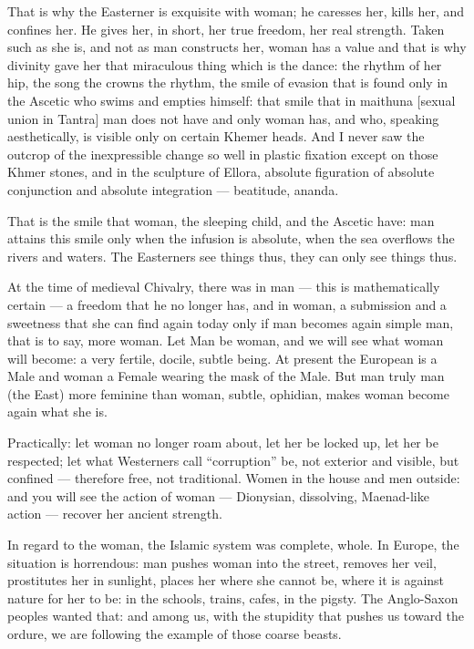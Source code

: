 That is why the Easterner is exquisite with woman; he caresses her, kills her, and confines her. He gives her, in short, her true freedom, her real strength. Taken such as she is, and not as man constructs her, woman has a value and that is why divinity gave her that miraculous thing which is the dance: the rhythm of her hip, the song the crowns the rhythm, the smile of evasion that is found only in the Ascetic who swims and empties himself: that smile that in maithuna [sexual union in Tantra] man does not have and only woman has, and who, speaking aesthetically, is visible only on certain Khemer heads. And I never saw the outcrop of the inexpressible change so well in plastic fixation except on those Khmer stones, and in the sculpture of Ellora, absolute figuration of absolute conjunction and absolute integration — beatitude, ananda.

That is the smile that woman, the sleeping child, and the Ascetic have: man attains this smile only when the infusion is absolute, when the sea overflows the rivers and waters. The Easterners see things thus, they can only see things thus.

At the time of medieval Chivalry, there was in man — this is mathematically certain — a freedom that he no longer has, and in woman, a submission and a sweetness that she can find again today only if man becomes again simple man, that is to say, more woman. Let Man be woman, and we will see what woman will become: a very fertile, docile, subtle being. At present the European is a Male and woman a Female wearing the mask of the Male. But man truly man (the East) more feminine than woman, subtle, ophidian, makes woman become again what she is.

Practically: let woman no longer roam about, let her be locked up, let her be respected; let what Westerners call “corruption” be, not exterior and visible, but confined — therefore free, not traditional. Women in the house and men outside: and you will see the action of woman — Dionysian, dissolving, Maenad-like action — recover her ancient strength.

In regard to the woman, the Islamic system was complete, whole. In Europe, the situation is horrendous: man pushes woman into the street, removes her veil, prostitutes her in sunlight, places her where she cannot be, where it is against nature for her to be: in the schools, trains, cafes, in the pigsty. The Anglo-Saxon peoples wanted that: and among us, with the stupidity that pushes us toward the ordure, we are following the example of those coarse beasts.

